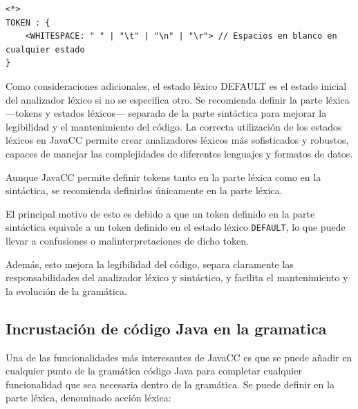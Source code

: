 \lstset{inputencoding=utf8/latin1}
\begin{lstlisting}
<*>
TOKEN : {
	<WHITESPACE: " " | "\t" | "\n" | "\r"> // Espacios en blanco en cualquier estado
}
\end{lstlisting}

Como consideraciones adicionales, el estado léxico DEFAULT es el estado inicial del analizador léxico si no se especifica otro.
Se recomienda definir la parte léxica ---tokens y estados léxicos--- separada de la parte sintáctica para mejorar la legibilidad y el mantenimiento del código.
La correcta utilización de los estados léxicos en JavaCC permite crear analizadores léxicos más sofisticados y robustos, capaces de manejar las complejidades de diferentes lenguajes y formatos de datos.


Aunque JavaCC permite definir tokens tanto en la parte léxica como en la sintáctica, se recomienda definirlos únicamente en la parte léxica. 

El principal motivo de esto es debido a que un token definido en la parte sintáctica equivale a un token definido en el estado léxico \lstinline{DEFAULT}, lo que puede llevar a confusiones o malinterpretaciones de dicho token.

Además, esto mejora la legibilidad del código, separa claramente las responsabilidades del analizador léxico y sintáctico, y facilita el mantenimiento y la evolución de la gramática.

\subsection{Incrustación de código Java en la gramatica}


Una de las funcionalidades más interesantes de JavaCC es que se puede añadir en cualquier punto de la gramática código Java para completar cualquier funcionalidad que sea necesaria dentro de la gramática. Se puede definir en la parte léxica, denominado acción léxica:

